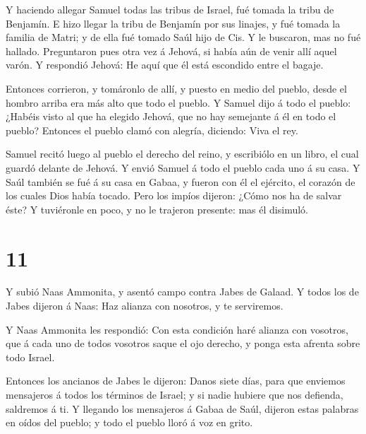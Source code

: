  Y haciendo allegar Samuel todas las tribus de Israel, fué
tomada la tribu de Benjamín.  E hizo llegar la tribu de
Benjamín por sus linajes, y fué tomada la familia de Matri; y de ella
fué tomado Saúl hijo de Cis. Y le buscaron, mas no fué hallado.
 Preguntaron pues otra vez á Jehová, si había aún de venir
allí aquel varón. Y respondió Jehová: He aquí que él está escondido
entre el bagaje.

 Entonces corrieron, y tomáronlo de allí, y puesto en medio
del pueblo, desde el hombro arriba era más alto que todo el pueblo.
 Y Samuel dijo á todo el pueblo: ¿Habéis visto al que ha
elegido Jehová, que no hay semejante á él en todo el pueblo? Entonces el
pueblo clamó con alegría, diciendo: Viva el rey.

 Samuel recitó luego al pueblo el derecho del reino, y
escribiólo en un libro, el cual guardó delante de Jehová. 
Y envió Samuel á todo el pueblo cada uno á su casa. Y Saúl también se
fué á su casa en Gabaa, y fueron con él el ejército, el corazón de los
cuales Dios había tocado.  Pero los impíos dijeron: ¿Cómo
nos ha de salvar éste? Y tuviéronle en poco, y no le trajeron presente:
mas él disimuló.

\hypertarget{section-10}{%
\section{11}\label{section-10}}

 Y subió Naas Ammonita, y asentó campo contra Jabes de
Galaad. Y todos los de Jabes dijeron á Naas: Haz alianza con nosotros, y
te serviremos.

 Y Naas Ammonita les respondió: Con esta condición haré
alianza con vosotros, que á cada uno de todos vosotros saque el ojo
derecho, y ponga esta afrenta sobre todo Israel.

 Entonces los ancianos de Jabes le dijeron: Danos siete
días, para que enviemos mensajeros á todos los términos de Israel; y si
nadie hubiere que nos defienda, saldremos á ti.  Y llegando
los mensajeros á Gabaa de Saúl, dijeron estas palabras en oídos del
pueblo; y todo el pueblo lloró á voz en grito.

